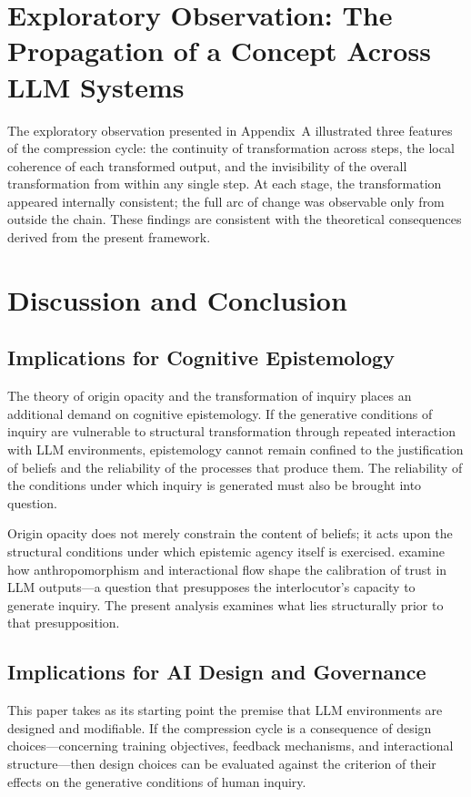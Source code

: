 \documentclass[12pt]{article}
\begin{document}
\section{Exploratory Observation: The Propagation of a Concept Across LLM Systems}

The exploratory observation presented in Appendix~A illustrated three features of the compression cycle: the continuity of transformation across steps, the local coherence of each transformed output, and the invisibility of the overall transformation from within any single step. At each stage, the transformation appeared internally consistent; the full arc of change was observable only from outside the chain. These findings are consistent with the theoretical consequences derived from the present framework.

\section{Discussion and Conclusion}

\subsection{Implications for Cognitive Epistemology}

The theory of origin opacity and the transformation of inquiry places an additional demand on cognitive epistemology. If the generative conditions of inquiry are vulnerable to structural transformation through repeated interaction with LLM environments, epistemology cannot remain confined to the justification of beliefs and the reliability of the processes that produce them. The reliability of the conditions under which inquiry is generated must also be brought into question.

Origin opacity does not merely constrain the content of beliefs; it acts upon the structural conditions under which epistemic agency itself is exercised. \citet{heersmink2024} examine how anthropomorphism and interactional flow shape the calibration of trust in LLM outputs---a question that presupposes the interlocutor's capacity to generate inquiry. The present analysis examines what lies structurally prior to that presupposition.

\subsection{Implications for AI Design and Governance}

This paper takes as its starting point the premise that LLM environments are designed and modifiable. If the compression cycle is a consequence of design choices---concerning training objectives, feedback mechanisms, and interactional structure---then design choices can be evaluated against the criterion of their effects on the generative conditions of human inquiry.
\end{document}
